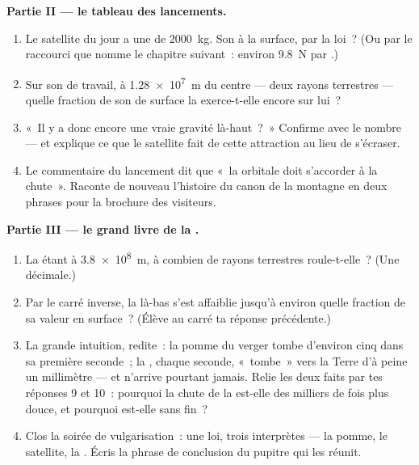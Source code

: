 \begin{problem}
\medskip\noindent\textbf{Partie II --- le tableau des lancements.}
\begin{enumerate}[resume]
  \item Le satellite du jour a une  de \qty{2000}{kg}. Son
         à la surface, par la loi~? (Ou par le raccourci que
        nomme le chapitre suivant~: environ \qty{9.8}{N} par
        .)
  \item Sur son  de travail, à \qty{1.28e7}{m} du centre ---
        deux rayons terrestres --- quelle fraction de son  de
        surface la  exerce-t-elle encore sur lui~?
  \item «~Il y a donc encore une vraie gravité là-haut~?~»
        Confirme avec le nombre --- et explique ce que le satellite
        fait de cette attraction au lieu de s'écraser.
  \item Le commentaire du lancement dit que «~la  orbitale
        doit s'accorder à la chute~». Raconte de nouveau l'histoire
        du canon de la montagne en deux phrases pour la brochure
        des visiteurs.
\end{enumerate}

\medskip\noindent\textbf{Partie III --- le grand livre de la .}
\begin{enumerate}[resume]
  \item La  étant à \qty{3.8e8}{m}, à combien de rayons
        terrestres roule-t-elle~? (Une décimale.)
  \item Par le carré inverse, la  là-bas s'est
        affaiblie jusqu'à environ quelle fraction de sa valeur en
        surface~? (Élève au carré ta réponse précédente.)
  \item La grande intuition, redite~: la pomme du verger tombe
        d'environ cinq  dans sa première seconde~; la ,
        chaque seconde, «~tombe~» vers la Terre d'à peine un
        millimètre --- et n'arrive pourtant jamais. Relie les deux
        faits par tes réponses 9 et 10~: pourquoi la chute de la
         est-elle des milliers de fois plus douce, et pourquoi
        est-elle sans fin~?
  \item Clos la soirée de vulgarisation~: une loi, trois
        interprètes --- la pomme, le satellite, la . Écris la
        phrase de conclusion du pupitre qui les réunit.
\end{enumerate}
\end{problem}
